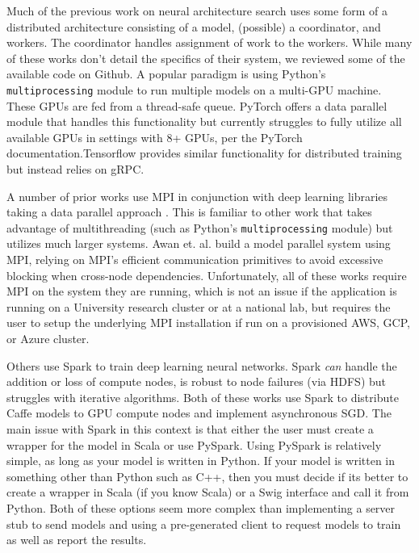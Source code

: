 \documentclass[conference]{IEEEtran}
\begin{document}
Much of the previous work on neural architecture search uses some form of a
distributed architecture consisting of a model, (possible) a coordinator, and workers. The
coordinator handles assignment of work to the workers. While many of these works
don't detail the specifics of their system, we reviewed some of the available
code on Github. A popular paradigm is using Python's \texttt{multiprocessing}
module to run multiple models on a multi-GPU machine. These GPUs are fed from a
thread-safe queue. PyTorch offers a data parallel module that handles this
functionality  but currently struggles to fully utilize all available GPUs in
settings with 8+ GPUs, per the PyTorch documentation.Tensorflow provides similar
functionality for distributed training but instead relies on gRPC.

A number of prior works use MPI in conjunction with deep learning libraries
taking a data parallel approach \cite{Awan:2016:ELM:2966884.2966912,
  Awan:2017:SCM:3018743.3018769, pmlr-v28-coates13, DBLP:journals/corr/VishnuSD16}.
This is familiar to other work that takes
advantage of multithreading (such as Python's \texttt{multiprocessing} module)
but utilizes much larger systems. Awan et. al.
\cite{Awan:2018:OBD:3236367.3236381} build a model parallel system using
MPI, relying on MPI's efficient communication primitives to avoid excessive
blocking when cross-node dependencies. Unfortunately, all of these works
require MPI on the system they are running, which is not an issue if the application
is running on a University research
cluster or at a national lab, but requires the user to setup the underlying MPI
installation if run on a provisioned AWS, GCP, or Azure cluster.

Others \cite{journals/corr/MoritzNSJ15, journals/corr/KimPJY16} use Spark
\cite{Zaharia:2016:ASU:3013530.2934664} to
train deep learning neural networks. Spark \emph{can} handle the addition or loss
of compute nodes, is robust to node failures (via HDFS) but struggles with
iterative algorithms. Both of these works use Spark to distribute Caffe
\cite{Jia:2014:CCA:2647868.2654889} models to GPU compute nodes
and implement asynchronous SGD. The main issue with Spark in this context
is that either the user must create a wrapper for the model in Scala or
use PySpark. Using PySpark is relatively simple, as long as your model is
written in Python. If your model is written in something other than Python
such as C++, then you must decide if its better to create a wrapper in Scala
(if you know Scala) or a Swig interface and call it from Python. Both of
these options seem more complex than implementing a server stub to send
models and using a pre-generated client to request models to train as well
as report the results.
\end{document}
